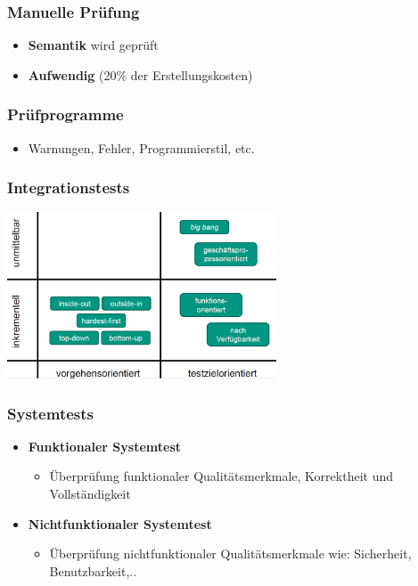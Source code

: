 		\subsubsection{Manuelle Prüfung}
			
			\begin{itemize}
				\item \textbf{Semantik} wird geprüft
				\item \textbf{Aufwendig} (20\% der Erstellungskosten)
			\end{itemize}
	
		\subsubsection{Prüfprogramme}
				
			\begin{itemize}
				\item Warnungen, Fehler, Programmierstil, etc.
			\end{itemize}
	
		\subsubsection{Integrationstests}
			
			\begin{center}
				\includegraphics[width=0.6\textwidth]{../images/integrationstests.png}
			\end{center}
		
		\subsubsection{Systemtests}
				
			\begin{itemize}
				\item \textbf{Funktionaler Systemtest}
				\begin{itemize}
					\item Überprüfung funktionaler Qualitätsmerkmale, Korrektheit und Vollständigkeit
				\end{itemize}
				\item \textbf{Nichtfunktionaler Systemtest}
				\begin{itemize}
					\item Überprüfung nichtfunktionaler Qualitätsmerkmale wie: Sicherheit, Benutzbarkeit,..
				\end{itemize}
			\end{itemize}
		
